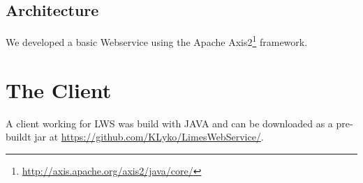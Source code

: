 \documentclass{article}
\begin{document}
\subsection{Architecture}
We developed a basic Webservice using the Apache Axis2\footnote{\url{http://axis.apache.org/axis2/java/core/}} framework. 

\section{The Client}
A client working for LWS was build with JAVA and can be downloaded as a pre-buildt jar at \url{https://github.com/KLyko/LimesWebService/}.
\end{document}

